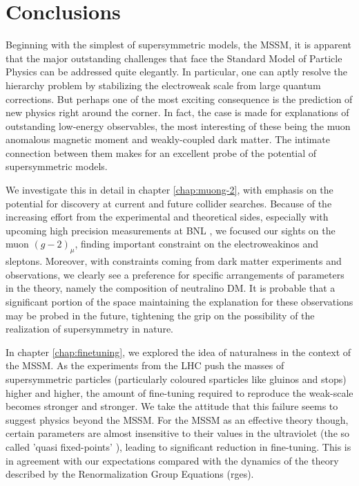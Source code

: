 \chapter{Conclusions}
\label{chap:conclusions}

Beginning with the simplest of supersymmetric models, the MSSM, it is apparent that the major outstanding challenges that face the Standard Model of Particle Physics can be addressed quite elegantly. In particular, one can aptly resolve the hierarchy problem by stabilizing the electroweak scale from large quantum corrections. But perhaps one of the most exciting consequence is the prediction of new physics right around the corner. In fact, the case is made for explanations of outstanding low-energy observables, the most interesting of these being the muon anomalous magnetic moment and weakly-coupled dark matter. The intimate connection between them makes for an excellent probe of the potential of supersymmetric models.

We investigate this in detail in chapter \ref{chap:muong-2}, with emphasis on the potential for discovery at current and future collider searches. Because of the increasing effort from the experimental and theoretical sides, especially with upcoming high precision measurements at BNL \cite{RN116}, we focused our sights on the muon $(g-2)_{\mu}$, finding important constraint on the electroweakinos and sleptons. Moreover, with constraints coming from dark matter experiments and observations, we clearly see a preference for specific arrangements of parameters in the theory, namely the composition of neutralino DM. It is probable that a significant portion of the space maintaining the explanation for these observations may be probed in the future, tightening the grip on the possibility of the realization of supersymmetry in nature.

In chapter \ref{chap:finetuning}, we explored the idea of naturalness in the context of the MSSM. As the experiments from the LHC push the masses of supersymmetric particles (particularly coloured sparticles like gluinos and stops) higher and higher, the amount of fine-tuning required to reproduce the weak-scale becomes stronger and stronger. We take the attitude that this failure seems to suggest physics beyond the MSSM. For the MSSM as an effective theory though, certain parameters are almost insensitive to their values in the ultraviolet (the so called 'quasi fixed-points' \cite{RN747,RN748}), leading to significant reduction in fine-tuning. This is in agreement with our expectations compared with the dynamics of the theory described by the Renormalization Group Equations (\acrshort{rge}s).

